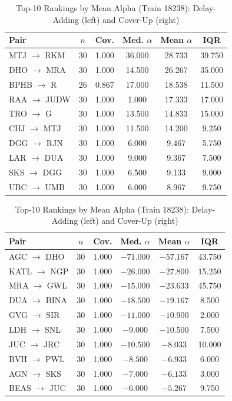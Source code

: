 \documentclass[conference]{IEEEtran}
\begin{document}
\begin{table}[!t]
\centering
\caption{Top-10 Rankings by Mean Alpha (Train 18238): Delay-Adding (left) and Cover-Up (right)}
\label{tab:mean_add}
\scriptsize
\setlength{\tabcolsep}{5pt}
\renewcommand{\arraystretch}{0.9}
\begin{minipage}[t]{0.485\textwidth}
\centering
\begin{tabular}{@{}lccccc@{}}
\toprule
Pair & $n$ & Cov. & Med. $\alpha$ & Mean $\alpha$ & IQR \\
\midrule
MTJ $\to$ RKM & 30 & 1.000 & 36.000 & 28.733 & 39.750 \\
DHO $\to$ MRA & 30 & 1.000 & 14.500 & 26.267 & 35.000 \\
BPHB $\to$ R & 26 & 0.867 & 17.000 & 18.538 & 11.500 \\
RAA $\to$ JUDW & 30 & 1.000 & 1.000 & 17.333 & 17.000 \\
TRO $\to$ G & 30 & 1.000 & 13.500 & 14.833 & 15.000 \\
CHJ $\to$ MTJ & 30 & 1.000 & 11.500 & 14.200 & 9.250 \\
DGG $\to$ RJN & 30 & 1.000 & 6.000 & 9.467 & 5.750 \\
LAR $\to$ DUA & 30 & 1.000 & 9.000 & 9.367 & 7.500 \\
SKS $\to$ DGG & 30 & 1.000 & 6.500 & 9.133 & 9.000 \\
UBC $\to$ UMB & 30 & 1.000 & 6.000 & 8.967 & 9.750 \\
\bottomrule
\end{tabular}
\end{minipage}\hfill
\begin{minipage}[t]{0.485\textwidth}
\centering
\begin{tabular}{@{}lccccc@{}}
\toprule
Pair & $n$ & Cov. & Med. $\alpha$ & Mean $\alpha$ & IQR \\
\midrule
AGC $\to$ DHO & 30 & 1.000 & $-71.000$ & $-57.167$ & 43.750 \\
KATL $\to$ NGP & 30 & 1.000 & $-26.000$ & $-27.800$ & 15.250 \\
MRA $\to$ GWL & 30 & 1.000 & $-15.000$ & $-23.633$ & 45.750 \\
DUA $\to$ BINA & 30 & 1.000 & $-18.500$ & $-19.167$ & 8.500 \\
GVG $\to$ SIR & 30 & 1.000 & $-11.000$ & $-10.900$ & 2.000 \\
LDH $\to$ SNL & 30 & 1.000 & $-9.000$ & $-10.500$ & 7.500 \\
JUC $\to$ JRC & 30 & 1.000 & $-10.500$ & $-8.033$ & 10.000 \\
BVH $\to$ PWL & 30 & 1.000 & $-8.500$ & $-6.933$ & 6.000 \\
AGN $\to$ SKS & 30 & 1.000 & $-7.000$ & $-6.133$ & 3.000 \\
BEAS $\to$ JUC & 30 & 1.000 & $-6.000$ & $-5.267$ & 9.750 \\
\bottomrule
\end{tabular}
\end{minipage}
\end{table}
\end{document}

